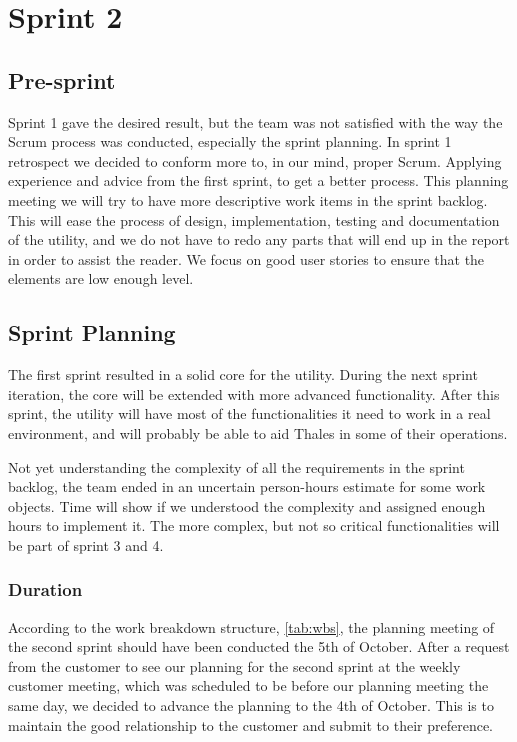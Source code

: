 \chapter{Sprint 2}

\section{Pre-sprint}
Sprint 1 gave the desired result, but the team was not satisfied with the way the Scrum process was conducted, especially the sprint planning. In sprint 1 retrospect we decided to conform more to, in our mind, proper Scrum. Applying experience and advice from the first sprint, to get a better process. 
This planning meeting we will try to have more descriptive work items in the sprint backlog. This will ease the process of design, implementation, testing and documentation of the utility, and we do not have to redo any parts that will end up in the report in order to assist the reader. We focus on good user stories to ensure that the elements are low enough level.


\section{Sprint Planning}
The first sprint resulted in a solid core for the utility. During the next sprint iteration, the core will be extended with more advanced functionality. After this sprint, the utility will have most of the functionalities it need to work in a real environment, and will probably be able to aid Thales in some of their operations.

Not yet understanding the complexity of all the requirements in the sprint backlog, the team ended in an uncertain person-hours estimate for some work objects. Time will show if we understood the complexity and assigned enough hours to implement it. The more complex, but not so critical functionalities will be part of sprint 3 and 4.   



\subsection{Duration}
According to the work breakdown structure, \autoref{tab:wbs}, the planning meeting of the second sprint should have been conducted the 5th of October. After a request from the customer to see our planning for the second sprint at the weekly customer meeting, which was scheduled to be before our planning meeting the same day, we decided to advance the planning to the 4th of October. This is to maintain the good relationship to the customer and submit to their preference.

